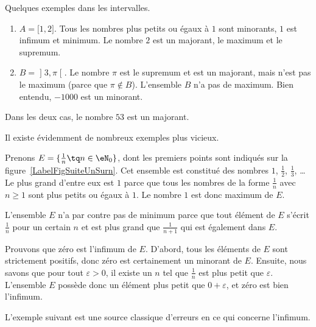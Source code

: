 \begin{example}
	Quelques exemples dans les intervalles.
	\begin{enumerate}
		\item
		      \( A=\mathopen[ 1 , 2 \mathclose]\). Tous les nombres plus petits ou égaux à \( 1\) sont minorants, \( 1\) est infimum et minimum. Le nombre \( 2\) est un majorant, le maximum et le supremum.
		\item
		      \( B=\mathopen] 3 , \pi \mathclose[\). Le nombre \( \pi\) est le supremum et est un majorant, mais n'est pas le maximum (parce que \( \pi\notin B\)). L'ensemble \( B\) n'a pas de maximum. Bien entendu, \( -1000\) est un minorant.
	\end{enumerate}
	Dans les deux cas, le nombre \( 53\) est un majorant.
\end{example}

Il existe évidemment de nombreux exemples plus vicieux.

\begin{example}
	Prenons \( E=\{ \frac{1}{ n }\tq n\in\eN_0 \}\), dont les premiers points sont indiqués sur la figure~\ref{LabelFigSuiteUnSurn}. Cet ensemble est constitué des nombres \( 1\), \( \frac{ 1 }{2}\), \( \frac{1}{ 3 }\), \ldots Le plus grand d'entre eux est \( 1\) parce que tous les nombres de la forme \( \frac{1}{ n }\) avec \( n\geq 1\) sont plus petits ou égaux à \( 1\). Le nombre \( 1\) est donc maximum de \( E\).

	L'ensemble \( E\) n'a par contre pas de minimum parce que tout élément de \( E\) s'écrit \( \frac{1}{ n }\) pour un certain \( n\) et est plus grand que \( \frac{1}{ n+1 }\) qui est également dans \( E\).

	Prouvons que zéro est l'infimum de \( E\). D'abord, tous les éléments de \( E\) sont strictement positifs, donc zéro est certainement un minorant de \( E\). Ensuite, nous savons que pour tout \( \varepsilon>0\), il existe un \( n\) tel que \( \frac{1}{ n }\) est plus petit que \( \varepsilon\). L'ensemble \( E\) possède donc un élément plus petit que \( 0+\varepsilon\), et zéro est bien l'infimum.
\end{example}

\newcommand{\CaptionFigSuiteUnSurn}{Les premiers points du type \( x_n=1/n\).}


L'exemple suivant est une source classique d'erreurs en ce qui concerne l'infimum.

